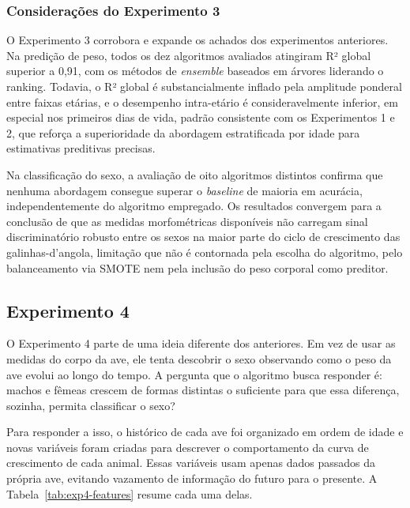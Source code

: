 \documentclass[12pt]{article}
\begin{document}
\subsubsection{Considerações do Experimento 3}

O Experimento 3 corrobora e expande os achados dos experimentos anteriores. Na
predição de peso, todos os dez algoritmos avaliados atingiram R² global superior
a 0,91, com os métodos de \textit{ensemble} baseados em árvores liderando o
ranking. Todavia, o R² global é substancialmente inflado pela amplitude ponderal
entre faixas etárias, e o desempenho intra-etário é consideravelmente inferior,
em especial nos primeiros dias de vida, padrão consistente com os Experimentos 1
e 2, que reforça a superioridade da abordagem estratificada por idade para
estimativas preditivas precisas.

Na classificação do sexo, a avaliação de oito algoritmos distintos confirma que
nenhuma abordagem consegue superar o \textit{baseline} de maioria em acurácia,
independentemente do algoritmo empregado. Os resultados convergem para a
conclusão de que as medidas morfométricas disponíveis não carregam sinal
discriminatório robusto entre os sexos na maior parte do ciclo de crescimento
das galinhas-d'angola, limitação que não é contornada pela escolha do algoritmo,
pelo balanceamento via SMOTE nem pela inclusão do peso corporal como preditor.

\subsection{Experimento 4}

O Experimento 4 parte de uma ideia diferente dos anteriores. Em vez de usar as
medidas do corpo da ave, ele tenta descobrir o sexo observando como o peso da
ave evolui ao longo do tempo. A pergunta que o algoritmo busca responder é:
machos e fêmeas crescem de formas distintas o suficiente para que essa
diferença, sozinha, permita classificar o sexo?

Para responder a isso, o histórico de cada ave foi organizado em ordem de idade
e novas variáveis foram criadas para descrever o comportamento da curva de
crescimento de cada animal. Essas variáveis usam apenas dados passados da
própria ave, evitando vazamento de informação do futuro para o presente. A
Tabela~\ref{tab:exp4-features} resume cada uma delas.
\end{document}
